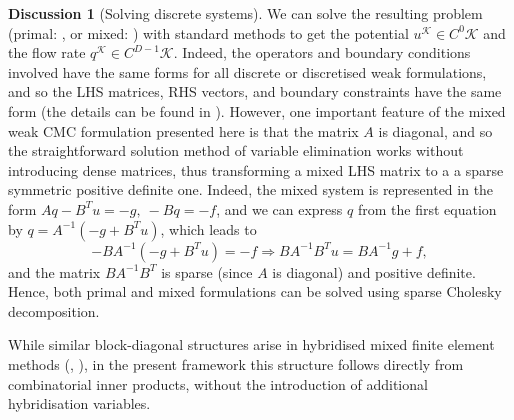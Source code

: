 \documentclass{elsarticle}
\theoremstyle{definition}
\newtheorem{discussion}[theorem]{Discussion}
\begin{document}
\begin{discussion}[Solving discrete systems]
  We can solve the resulting problem
  (primal: ,
  or mixed: )
  with standard methods to get
  the potential $u^\mathcal{K} \in C^0 \mathcal{K}$ and
  the flow rate $q^\mathcal{K} \in C^{D - 1} \mathcal{K}$.
  Indeed, the operators and boundary conditions involved have the same forms for all discrete or discretised weak formulations, and so the LHS matrices, RHS vectors, and boundary constraints have the same form
  (the details can be found in \cite[Equations 2.7--2.10, 2.21--2.24]{berbatov2021guide}).
  However, one important feature of the mixed weak CMC formulation presented here is that the matrix $A$ is diagonal, and so the straightforward solution method of variable elimination works without introducing dense matrices, thus transforming a mixed LHS matrix to a a sparse symmetric positive definite one.
  Indeed, the mixed system is represented in the form $A q - B^T u = - g,\ - B q = - f$, and we can express $q$ from the first equation by $q = A^{-1}(-g + B^T u)$, which leads to
  \begin{equation}
    - B A^{-1}(-g + B^T u) = - f \Rightarrow B A^{-1} B^T u = B A^{-1} g + f,
  \end{equation}
  and the matrix $B A^{-1} B^T$ is sparse (since $A$ is diagonal) and positive definite.
  Hence, both primal and mixed formulations can be solved using sparse Cholesky decomposition.

  While similar block-diagonal structures arise in hybridised mixed finite
  element methods (\cite[Section 7.2]{boffi2013mixed},
  \cite[Introduction]{arnold1985mixed}), in the present framework this structure
  follows directly from combinatorial inner products, without the introduction
  of additional hybridisation variables.
\end{discussion}
\end{document}
